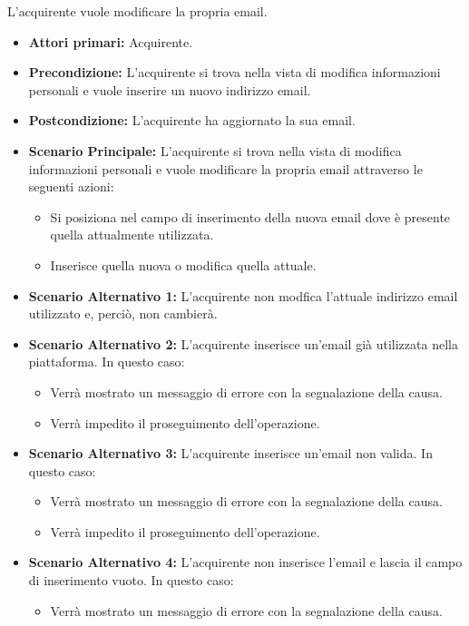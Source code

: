 L'acquirente vuole modificare la propria email.
\begin{itemize}
    \item \textbf{Attori primari:} Acquirente.
    \item \textbf{Precondizione:} L'acquirente si trova nella vista di modifica informazioni personali e vuole inserire un nuovo indirizzo email.
    \item \textbf{Postcondizione:} L'acquirente ha aggiornato la sua email.
    \item \textbf{Scenario Principale:} L'acquirente si trova nella vista di modifica informazioni personali e vuole modificare la propria email attraverso le seguenti azioni:
        \begin{itemize}
            \item Si posiziona nel campo di inserimento della nuova email dove è presente quella attualmente utilizzata.
            \item Inserisce quella nuova o modifica quella attuale.
        \end{itemize}
    \item \textbf{Scenario Alternativo 1:} L'acquirente non modfica l'attuale indirizzo email utilizzato e, perciò, non cambierà.
    \item \textbf{Scenario Alternativo 2:} L'acquirente inserisce un'email già utilizzata nella piattaforma. In questo caso:
    \begin{itemize}
        \item Verrà mostrato un messaggio di errore con la segnalazione della causa.
        \item Verrà impedito il proseguimento dell'operazione.
    \end{itemize}
    \item \textbf{Scenario Alternativo 3:} L'acquirente inserisce un'email non valida. In questo caso:
    \begin{itemize}
        \item Verrà mostrato un messaggio di errore con la segnalazione della causa.
        \item Verrà impedito il proseguimento dell'operazione.
    \end{itemize}
    \item \textbf{Scenario Alternativo 4:} L'acquirente non inserisce l'email e lascia il campo di inserimento vuoto. In questo caso:
    \begin{itemize}
        \item Verrà mostrato un messaggio di errore con la segnalazione della causa.

\end{itemize}
\end{itemize}
